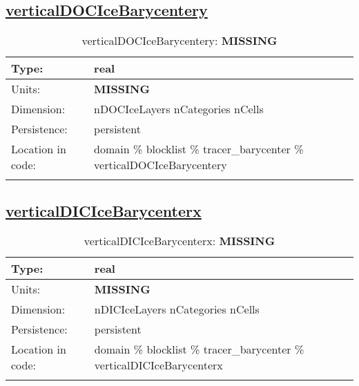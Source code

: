 \subsection[verticalDOCIceBarycentery]{\hyperref[sec:var_tab_tracer_barycenter]{verticalDOCIceBarycentery}}
\label{subsec:var_sec_tracer_barycenter_verticalDOCIceBarycentery}
\begin{center}
\begin{longtable}{| p{2.0in} | p{4.0in} |}
        \hline 
        Type: & real \\
        \hline 
        Units: & {\bf \color{red} MISSING} \\
        \hline 
        Dimension: & nDOCIceLayers nCategories nCells \\
        \hline 
        Persistence: & persistent \\
        \hline 
         Location in code: & domain \% blocklist \% tracer\_barycenter \% verticalDOCIceBarycentery \\
         \hline 
    \caption{verticalDOCIceBarycentery: {\bf \color{red} MISSING}}
\end{longtable}
\end{center}
\subsection[verticalDICIceBarycenterx]{\hyperref[sec:var_tab_tracer_barycenter]{verticalDICIceBarycenterx}}
\label{subsec:var_sec_tracer_barycenter_verticalDICIceBarycenterx}
\begin{center}
\begin{longtable}{| p{2.0in} | p{4.0in} |}
        \hline 
        Type: & real \\
        \hline 
        Units: & {\bf \color{red} MISSING} \\
        \hline 
        Dimension: & nDICIceLayers nCategories nCells \\
        \hline 
        Persistence: & persistent \\
        \hline 
         Location in code: & domain \% blocklist \% tracer\_barycenter \% verticalDICIceBarycenterx \\
         \hline 
    \caption{verticalDICIceBarycenterx: {\bf \color{red} MISSING}}
\end{longtable}
\end{center}
